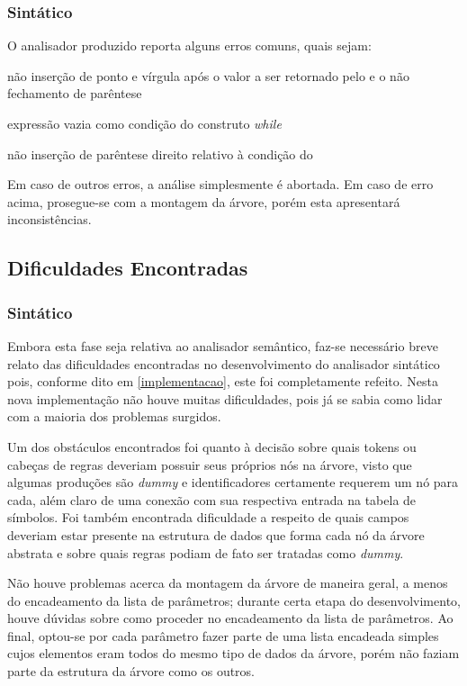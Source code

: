 \documentclass[
	article,			%
	11pt,				%
	oneside,			%
	a4paper,			%
	english,			%
	brazil,				%
	sumario=tradicional
	]{abntex2}
\renewcommand{\it}[1]{\textit{#1}}
\begin{document}
\subsubsection{Sintático}
O analisador produzido reporta alguns erros comuns, quais sejam:

\begin{itemize}{
		\item não inserção de ponto e vírgula após o valor a ser retornado pelo  e o não fechamento de parêntese 
		\item expressão vazia como condição do construto \it{while}
		\item não inserção de parêntese direito relativo à condição do 
	}
\end{itemize}
Em caso de outros erros, a análise simplesmente é abortada. Em caso de erro acima, prosegue-se com a montagem da árvore, porém esta apresentará inconsistências.

\subsection {Dificuldades Encontradas}

\subsubsection{Sintático}
\label{difSintatico}
Embora esta fase seja relativa ao analisador semântico, faz-se necessário breve relato das dificuldades encontradas no desenvolvimento do analisador sintático pois, conforme dito em \ref{implementacao},
este foi completamente refeito. Nesta nova implementação não houve muitas dificuldades, pois já se sabia como lidar com a maioria dos problemas surgidos.

Um dos obstáculos encontrados foi quanto à decisão sobre quais tokens ou cabeças de regras deveriam possuir seus próprios nós na árvore, visto que algumas produções são \it{dummy} e identificadores certamente requerem um nó para cada, além claro de uma conexão com sua respectiva entrada na tabela de símbolos. Foi
também encontrada dificuldade a respeito de quais campos deveriam estar presente na estrutura de dados que forma cada nó da árvore abstrata e sobre quais regras podiam de fato ser tratadas como \it{dummy}.

Não houve problemas acerca da montagem da árvore de maneira geral, a menos do encadeamento da lista de parâmetros; durante certa etapa do desenvolvimento, houve dúvidas sobre como proceder no encadeamento da lista de parâmetros. Ao final, optou-se por cada parâmetro fazer parte de uma lista encadeada simples cujos elementos eram todos do mesmo tipo de dados da árvore, porém não faziam parte da estrutura da árvore como os outros.
\end{document}
